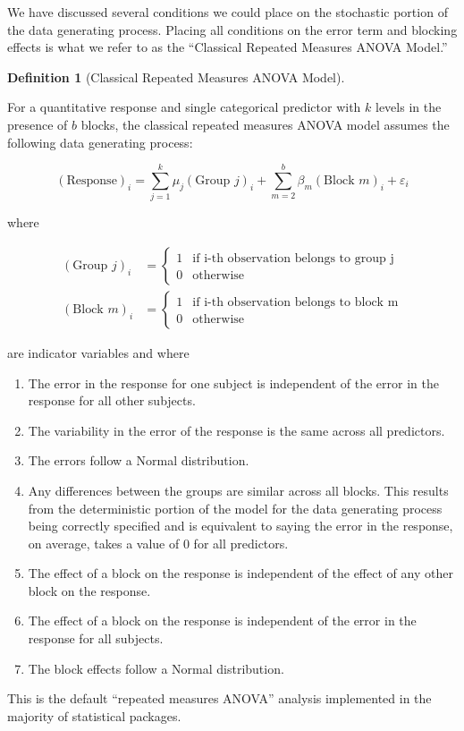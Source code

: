 \documentclass[
  letterpaper,
  DIV=11,
  numbers=noendperiod]{scrreprt}
\providecommand{\tightlist}{%
  \setlength{\itemsep}{0pt}\setlength{\parskip}{0pt}}\usepackage{longtable,booktabs,array}
\theoremstyle{plain}
\theoremstyle{definition}
\theoremstyle{definition}
\newtheorem{definition}{Definition}[chapter]
\theoremstyle{remark}
\begin{document}
We have discussed several conditions we could place on the stochastic
portion of the data generating process. Placing all conditions on the
error term and blocking effects is what we refer to as the ``Classical
Repeated Measures ANOVA Model.''

\begin{definition}[Classical Repeated Measures ANOVA
Model]\protect\hypertarget{def-classical-repeated-measures-anova}{}\label{def-classical-repeated-measures-anova}

For a quantitative response and single categorical predictor with \(k\)
levels in the presence of \(b\) blocks, the classical repeated measures
ANOVA model assumes the following data generating process:

\[(\text{Response})_i = \sum_{j=1}^{k} \mu_j (\text{Group } j)_i + \sum_{m=2}^{b} \beta_m (\text{Block } m)_i + \varepsilon_i\]

where

\[
\begin{aligned}
  (\text{Group } j)_{i} &= \begin{cases}
    1 & \text{if i-th observation belongs to group j} \\
    0 & \text{otherwise}
    \end{cases} \\
  (\text{Block } m)_{i} &= \begin{cases}
    1 & \text{if i-th observation belongs to block m} \\
    0 & \text{otherwise}
    \end{cases}
\end{aligned}
\]

are indicator variables and where

\begin{enumerate}
\def\labelenumi{\arabic{enumi}.}
\tightlist
\item
  The error in the response for one subject is independent of the error
  in the response for all other subjects.
\item
  The variability in the error of the response is the same across all
  predictors.
\item
  The errors follow a Normal distribution.
\item
  Any differences between the groups are similar across all blocks. This
  results from the deterministic portion of the model for the data
  generating process being correctly specified and is equivalent to
  saying the error in the response, on average, takes a value of 0 for
  all predictors.
\item
  The effect of a block on the response is independent of the effect of
  any other block on the response.
\item
  The effect of a block on the response is independent of the error in
  the response for all subjects.
\item
  The block effects follow a Normal distribution.
\end{enumerate}

This is the default ``repeated measures ANOVA'' analysis implemented in
the majority of statistical packages.

\end{definition}
\end{document}
